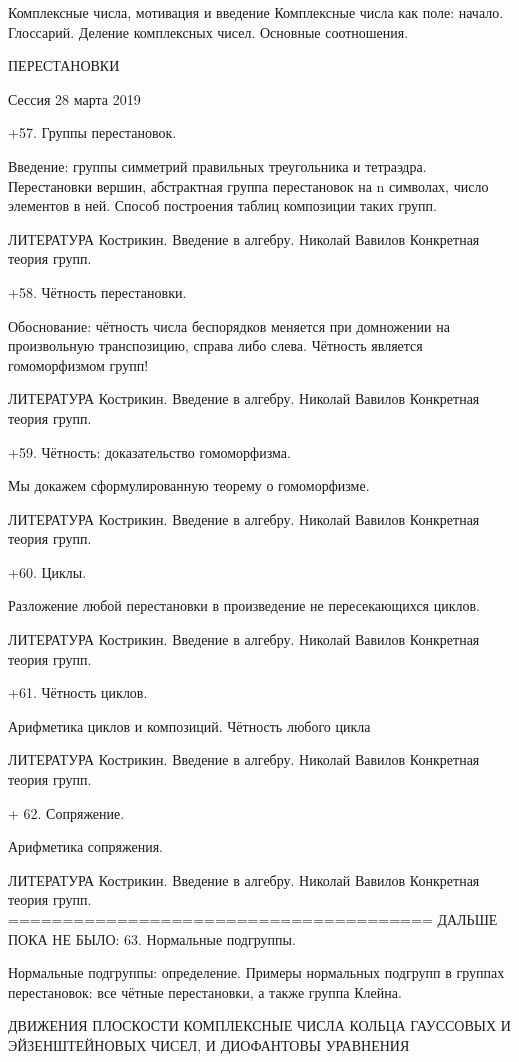    Комплексные числа, мотивация и введение
    Комплексные числа как поле: начало. Глоссарий.
    Деление комплексных чисел. Основные соотношения.

ПЕРЕСТАНОВКИ

Сессия 28 марта 2019

+57. Группы перестановок.

Введение: группы симметрий правильных треугольника и тетраэдра. 
Перестановки вершин, абстрактная группа перестановок на n символах, 
число элементов в ней. Способ построения таблиц композиции таких групп.

ЛИТЕРАТУРА Кострикин. Введение в алгебру. Николай Вавилов Конкретная теория групп.

+58. Чётность перестановки.

Обоснование: чётность числа беспорядков меняется при домножении на произвольную 
транспозицию, справа либо слева. Чётность является гомоморфизмом групп!

ЛИТЕРАТУРА Кострикин. Введение в алгебру. Николай Вавилов Конкретная теория групп.

+59. Чётность: доказательство гомоморфизма.

Мы докажем сформулированную теорему о гомоморфизме.

ЛИТЕРАТУРА Кострикин. Введение в алгебру. Николай Вавилов Конкретная теория групп.

+60. Циклы.

Разложение любой перестановки в произведение не пересекающихся циклов.

ЛИТЕРАТУРА Кострикин. Введение в алгебру. Николай Вавилов Конкретная теория групп.

+61. Чётность циклов.

Арифметика циклов и композиций. Чётность любого цикла

ЛИТЕРАТУРА Кострикин. Введение в алгебру. Николай Вавилов Конкретная теория групп.

+ 62. Сопряжение.

Арифметика сопряжения.

ЛИТЕРАТУРА Кострикин. Введение в алгебру. Николай Вавилов Конкретная теория групп.
=======================================
ДАЛЬШЕ ПОКА НЕ БЫЛО:
63. Нормальные подгруппы.

Нормальные подгруппы: определение. Примеры нормальных подгрупп в группах 
перестановок: все чётные перестановки, а также группа Клейна.

ДВИЖЕНИЯ ПЛОСКОСТИ
КОМПЛЕКСНЫЕ ЧИСЛА
КОЛЬЦА ГАУССОВЫХ И ЭЙЗЕНШТЕЙНОВЫХ ЧИСЕЛ, И ДИОФАНТОВЫ УРАВНЕНИЯ

